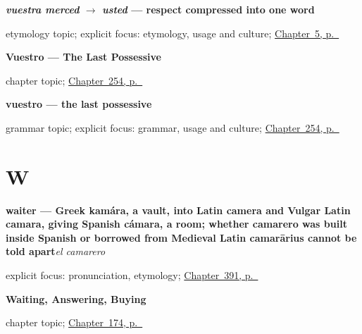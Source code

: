 \noindent\begin{minipage}[t]{\linewidth}
\raggedright
\textbf{\emph{vuestra merced} $\to$ \emph{usted} — respect compressed into one word}\par
\footnotesize etymology topic; explicit focus: etymology, usage and culture; \hyperref[ch:three-yous]{Chapter~5, p.~\pageref*{ch:three-yous}}
\end{minipage}\par\smallskip

\noindent\begin{minipage}[t]{\linewidth}
\raggedright
\textbf{Vuestro --- The Last Possessive}\par
\footnotesize chapter topic; \hyperref[ch:vuestro]{Chapter~254, p.~\pageref*{ch:vuestro}}
\end{minipage}\par\smallskip

\noindent\begin{minipage}[t]{\linewidth}
\raggedright
\textbf{vuestro — the last possessive}\par
\footnotesize grammar topic; explicit focus: grammar, usage and culture; \hyperref[ch:vuestro]{Chapter~254, p.~\pageref*{ch:vuestro}}
\end{minipage}\par\smallskip

\section*{W}

\noindent\begin{minipage}[t]{\linewidth}
\raggedright
\textbf{waiter — Greek kamára, a vault, into Latin camera and Vulgar Latin camara, giving Spanish cámara, a room; whether camarero was built inside Spanish or borrowed from Medieval Latin camarārius cannot be told apart}\enspace\emph{el camarero}\par
\footnotesize explicit focus: pronunciation, etymology; \hyperref[ch:el-menu-y-el-camarero]{Chapter~391, p.~\pageref*{ch:el-menu-y-el-camarero}}
\end{minipage}\par\smallskip

\noindent\begin{minipage}[t]{\linewidth}
\raggedright
\textbf{Waiting, Answering, Buying}\par
\footnotesize chapter topic; \hyperref[ch:spanish-wait-answer-buy]{Chapter~174, p.~\pageref*{ch:spanish-wait-answer-buy}}
\end{minipage}\par\smallskip

